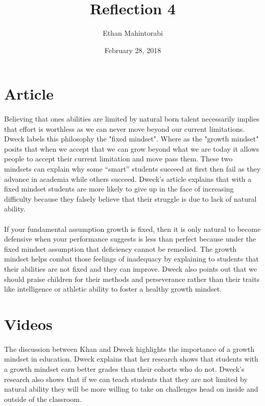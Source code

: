 \documentclass{article}
\begin{document}
  
  \title{Reflection 4}
  \author{Ethan Mahintorabi}
  \date{February 28, 2018}
  
  \maketitle

  
  \section*{Article}
    \paragraph{}
    Believing that ones abilities are limited by natural born talent necessarily implies that effort is worthless as we can never move beyond our current limitations. Dweck labels this philosophy the "fixed mindset". Where as the "growth mindset" posits that when we accept that we can grow beyond what we are today it allows people to accept their current limitation and move pass them. These two mindsets can explain why some ``smart'' students succeed at first then fail as they advance in academia while others succeed. Dweck's article explains that with a fixed mindset students are more likely to give up in the face of increasing difficulty because they falsely believe that their struggle is due to lack of natural ability. 
    
    \paragraph{}
    If your fundamental assumption growth is fixed, then it is only natural to become defensive when your performance suggests is less than perfect because under the fixed mindset assumption that deficiency cannot be remedied. The growth mindset helps combat those feelings of inadequacy by explaining to students that their abilities are not fixed and they can improve. Dweck also points out that we should praise children for their methods and perseverance rather than their traits like intelligence or athletic ability to foster a healthy growth mindset.

  \section*{Videos}
    \paragraph{}
    The discussion between Khan and Dweck highlights the importance of a growth mindset in education. Dweck explains that her research shows that students with a growth mindset earn better grades than their cohorts who do not. Dweck's research also shows that if we can teach students that they are not limited by natural ability they will be more willing to take on challenges head on inside and outside of the classroom.
        
\end{document}
